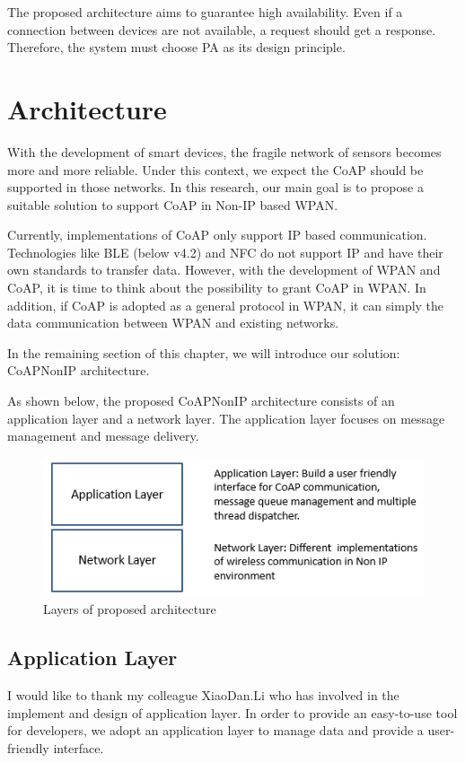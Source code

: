 \documentclass{Nan_Thesis}
\begin{document}
The proposed architecture aims to guarantee high availability.  Even if a connection between devices are not available, a request should get a response. Therefore, the system must choose PA as its design principle.

\chapter{Architecture}
With the development of smart devices, the fragile network of sensors becomes more and more reliable. Under this context, we expect the CoAP should be supported in those networks. In this research, our main goal is to propose a suitable solution to support CoAP in Non-IP based WPAN.  

Currently, implementations of CoAP only support IP based communication. Technologies like BLE (below v4.2) and NFC do not support IP and have their own standards to transfer data. However, with the development of WPAN and CoAP, it is time to think about the possibility to grant CoAP in WPAN. In addition, if CoAP is adopted as a general protocol in WPAN, it can simply the data communication between WPAN and existing networks.

In the remaining section of this chapter, we will introduce our solution: CoAPNonIP architecture.  

As shown below, the proposed CoAPNonIP architecture consists of an application layer and a network layer. The application layer focuses on message management and message delivery.  

\begin{figure}[h]
  \centering 
      \includegraphics[scale=1]{pic/designlayers.png} 
  \caption{Layers of proposed architecture}
\end{figure} 

\section{Application Layer}
I would like to thank my colleague XiaoDan.Li who has involved in the implement and design of application layer.
In order to provide an easy-to-use tool for developers, we adopt an application layer to manage data and provide a user-friendly interface. 
\end{document}
